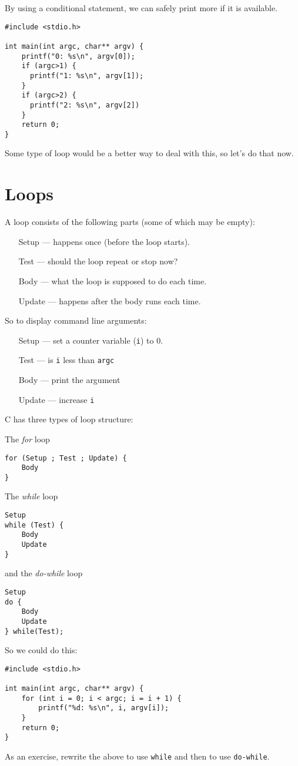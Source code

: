 By using a conditional statement, we can safely print more if it is available.
\begin{lstlisting}
#include <stdio.h>

int main(int argc, char** argv) {
    printf("0: %s\n", argv[0]);
    if (argc>1) {
      printf("1: %s\n", argv[1]);    
    }
    if (argc>2) {
      printf("2: %s\n", argv[2])
    }
    return 0;
}
\end{lstlisting}
Some type of loop would be a better way to deal with this, so let's do that now.

\section{Loops}
A loop consists of the following parts (some of which may be empty):
\begin{itemize}
 \item [Setup] --- happens once (before the loop starts).
 \item [Test]  --- should the loop repeat or stop now?
 \item [Body]  --- what the loop is supposed to do each time.
 \item [Update] --- happens after the body runs each time.
\end{itemize}

So to display command line arguments:
\begin{itemize}
 \item [Setup] --- set a counter variable (\texttt{i}) to 0.
 \item [Test]  --- is \texttt{i} less than \texttt{argc}
 \item [Body]  --- print the argument
 \item [Update] --- increase \texttt{i}
\end{itemize}

C has three types of loop structure:

The \emph{for} loop
\begin{lstlisting}
for (Setup ; Test ; Update) {
    Body
}
\end{lstlisting}

The \emph{while} loop
\begin{lstlisting}
Setup
while (Test) {
    Body
    Update
}
\end{lstlisting}

and the \emph{do-while} loop
\begin{lstlisting}
Setup
do {
    Body
    Update
} while(Test);
\end{lstlisting}

So we could do this:
\begin{lstlisting}
#include <stdio.h>

int main(int argc, char** argv) {
    for (int i = 0; i < argc; i = i + 1) {
        printf("%d: %s\n", i, argv[i]);
    }
    return 0;
}
\end{lstlisting}

As an exercise, rewrite the above to use \texttt{while} and then to use \texttt{do-while}.
